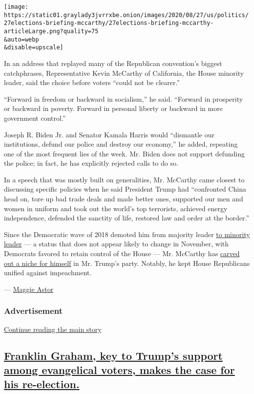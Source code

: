 \texttt{[image: https://static01.graylady3jvrrxbe.onion/images/2020/08/27/us/politics/27elections-briefing-mccarthy/27elections-briefing-mccarthy-articleLarge.png?quality=75\\\&auto=webp\\\&disable=upscale]}

In an address that replayed many of the Republican convention's biggest
catchphrases, Representative Kevin McCarthy of California, the House
minority leader, said the choice before voters ``could not be clearer.''

``Forward in freedom or backward in socialism,'' he said. ``Forward in
prosperity or backward in poverty. Forward in personal liberty or
backward in more government control.''

Joseph R. Biden Jr. and Senator Kamala Harris would ``dismantle our
institutions, defund our police and destroy our economy,'' he added,
repeating one of the most frequent lies of the week. Mr. Biden does not
support defunding the police; in fact, he has explicitly rejected calls
to do so.

In a speech that was mostly built on generalities, Mr. McCarthy came
closest to discussing specific policies when he said President Trump had
``confronted China head on, tore up bad trade deals and made better
ones, supported our men and women in uniform and took out the world's
top terrorists, achieved energy independence, defended the sanctity of
life, restored law and order at the border.''

Since the Democratic wave of 2018 demoted him from majority leader
\href{https://www.nytimes3xbfgragh.onion/2018/11/13/us/politics/kevin-mccarthy-house-republican-leader.html}{to
minority leader} --- a status that does not appear likely to change in
November, with Democrats favored to retain control of the House --- Mr.
McCarthy has
\href{https://www.nytimes3xbfgragh.onion/2020/01/22/us/politics/kevin-mccarthy-trump.html}{carved
out a niche for himself} in Mr. Trump's party. Notably, he kept House
Republicans unified against impeachment.

--- \href{https://www.nytimes3xbfgragh.onion/by/maggie-astor}{Maggie
Astor}

\hypertarget{advertisement-7}{%
\subsubsection{Advertisement}\label{advertisement-7}}

\protect\hyperlink{after-dfp-ad-mid8}{Continue reading the main story}

\hypertarget{franklin-graham-key-to-trumps-support-among-evangelical-voters-makes-the-case-for-his-re-election}{%
\subsection{\texorpdfstring{\protect\hyperlink{franklin-graham-key-to-trumps-support-among-evangelical-voters-makes-the-case-for-his-re-election}{Franklin
Graham, key to Trump's support among evangelical voters, makes the case
for his
re-election.}}{Franklin Graham, key to Trump's support among evangelical voters, makes the case for his re-election.}}\label{franklin-graham-key-to-trumps-support-among-evangelical-voters-makes-the-case-for-his-re-election}}

